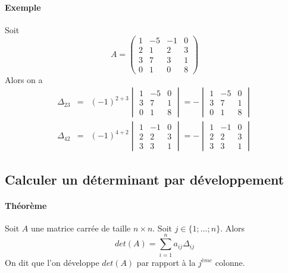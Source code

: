 \paragraph{Exemple} Soit
$$A = \begin{pmatrix}
  1 & -5 & -1 & 0 \\
  2 & 1 & 2 & 3 \\
  3 & 7 & 3 & 1 \\
  0 & 1 & 0 & 8
\end{pmatrix}$$
Alors on a
\begin{eqnarray*}
  \Delta_{23} &=& (-1)^{2+3} \begin{vmatrix} 1 & -5 & 0 \\ 3 & 7 & 1 \\ 0 & 1 & 8 \end{vmatrix}
    = - \begin{vmatrix} 1 & -5 & 0 \\ 3 & 7 & 1 \\ 0 & 1 & 8 \end{vmatrix} \\
  \Delta_{42} &=& (-1)^{4 + 2} \begin{vmatrix} 1 & -1 & 0 \\ 2 & 2 & 3 \\ 3 & 3 & 1 \end{vmatrix}
    = - \begin{vmatrix} 1 & -1 & 0 \\ 2 & 2 & 3 \\ 3 & 3 & 1 \end{vmatrix}
\end{eqnarray*}

%
\subsection{Calculer un déterminant par développement}
%
\paragraph{Théorème} Soit $A$ une matrice carrée de taille $n\times n$. Soit $j \in \{1; \ldots; n\}$. Alors
$$det(A) = \sum_{i=1}^{n} a_{ij} \Delta_{ij}$$
On dit que l'on développe $det(A)$ par rapport à la $j^{ème}$ colonne.

